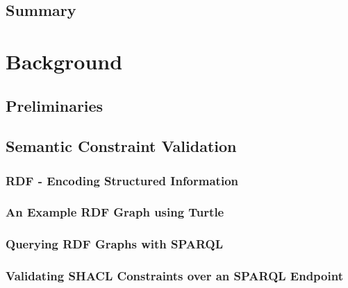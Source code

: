 \documentclass[11pt,a4paper, DIV=12]{report}
\begin{document}
    \section{Summary}
        

\chapter{Background}
    \label{section_background}
    
    \section{Preliminaries}
        
    \section{Semantic Constraint Validation}
        
        \subsection{RDF - Encoding Structured Information}
            \label{background_rdf}
            
        \subsection{An Example RDF Graph using Turtle}
            \label{background_turtle}
            

        \subsection{Querying RDF Graphs with SPARQL}
            \label{background_sparql}
            

        \subsection{Validating SHACL Constraints over an SPARQL Endpoint}
            \label{background_shacl}
            
\end{document}
